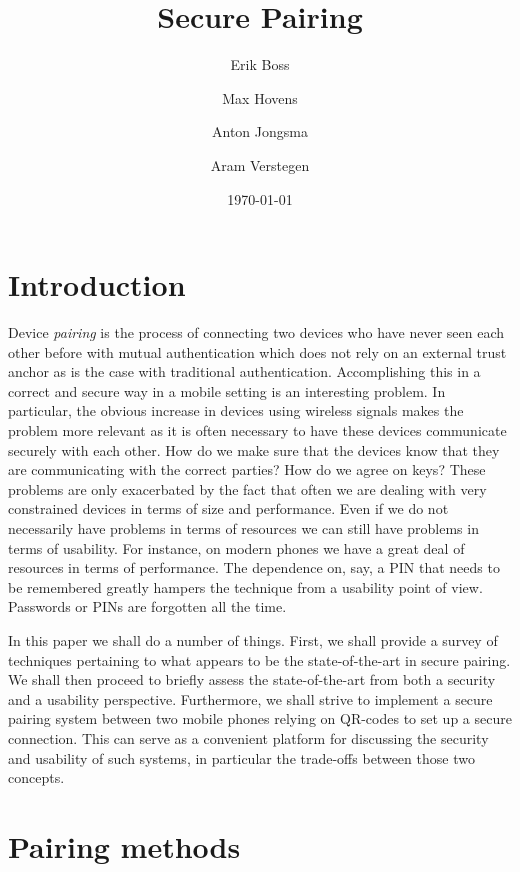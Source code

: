 \documentclass[conference, 11pt]{sty/IEEEtran}
\title{Secure Pairing}
\author{Erik Boss \and Max Hovens \and Anton Jongsma \and Aram Verstegen}
\date{\today}
\begin{document}
\maketitle

\begin{abstract}
    
\end{abstract}

\section{Introduction}
\label{sec:introduction}


Device \textit{pairing} is the process of connecting two devices who have never seen each other before with mutual authentication which does not rely on an external trust anchor as is the case with traditional authentication.
Accomplishing this in a correct and secure way in a mobile setting is an interesting problem.
In particular, the obvious increase in devices using wireless signals makes the problem more relevant as it is often necessary to have these devices communicate securely with each other.
How do we make sure that the devices know that they are communicating with the correct parties?
How do we agree on keys?
These problems are only exacerbated by the fact that often we are dealing with very constrained devices in terms of size and performance.
Even if we do not necessarily have problems in terms of resources we can still have problems in terms of usability.
For instance, on modern phones we have a great deal of resources in terms of performance.
The dependence on, say, a PIN that needs to be remembered greatly hampers the technique from a usability point of view. 
Passwords or PINs are forgotten all the time.

In this paper we shall do a number of things.
First, we shall provide a survey of techniques pertaining to what appears to be the state-of-the-art in secure pairing.
We shall then proceed to briefly assess the state-of-the-art from both a security and a usability perspective.
Furthermore, we shall strive to implement a secure pairing system between two mobile phones relying on QR-codes to set up a secure connection.
This can serve as a convenient platform for discussing the security and usability of such systems, in particular the trade-offs between those two concepts.

\section{Pairing methods}
\end{document}
